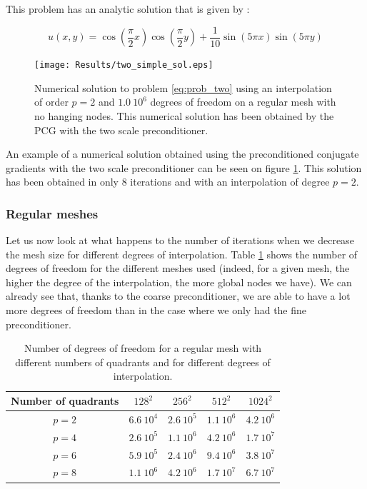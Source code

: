 This problem has an analytic solution that is given by : 

$$ u(x,y) = \cos(\frac{\pi}{2}x)\cos(\frac{\pi}{2}y) + \frac{1}{10}\sin(5\pi x)\sin(5\pi y)$$

\begin{figure}
\centering
\texttt{[image: Results/two\_simple\_sol.eps]}
\caption{Numerical solution to problem \ref{eq:prob_two} using an interpolation of order $p=2$ and $1.0\:10^{6}$ degrees of freedom on a regular mesh with no hanging nodes. This numerical solution has been obtained by the PCG with the two scale preconditioner.}
\label{two_simple_sol}
\end{figure}


An example of a numerical solution obtained using the preconditioned conjugate gradients with the two scale preconditioner can be seen on figure \ref{two_simple_sol}. This solution has been obtained in only 8 iterations and with an interpolation of degree $p=2$. 

\subsubsection{Regular meshes}

Let us now look at what happens to the number of iterations when we decrease the mesh size for different degrees of interpolation. Table \ref{two_table_reg} shows the number of degrees of freedom for the different meshes used (indeed, for a given mesh, the higher the degree of the interpolation, the more global nodes we have). We can already see that, thanks to the coarse preconditioner, we are able to have a lot more degrees of freedom than in the case where we only had the fine preconditioner.

\begin{table}
\centering
\begin{tabular}{c|cccc}
\hline
Number of quadrants & $128^2$ & $256^2$ & $512^2$ & $1024^2$\\
\hline
$p=2$ & $6.6\:10^4$ & $2.6\:10^5$ & $1.1\:10^6$ & $4.2\:10^6$ \\
$p=4$ & $2.6\:10^5$ & $1.1\:10^6$ & $4.2\:10^6$ & $1.7\:10^7$ \\
$p=6$ & $5.9\:10^5$ & $2.4\:10^6$ & $9.4\:10^6$ & $3.8\:10^7$ \\
$p=8$ & $1.1\:10^6$ & $4.2\:10^6$ & $1.7\:10^7$ & $6.7\:10^7$ \\
\hline
\end{tabular}
\caption{Number of degrees of freedom for a regular mesh with different numbers of quadrants and for different degrees of interpolation.}
\label{two_table_reg}
\end{table}


